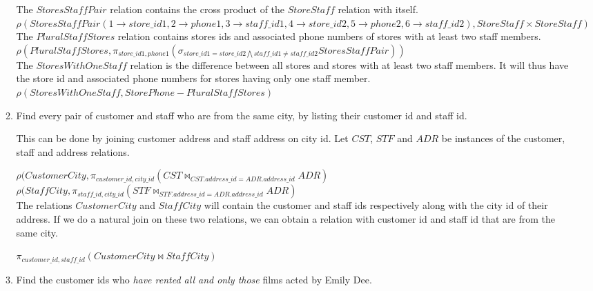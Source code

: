 \documentclass[paper=a4, fontsize=11pt]{scrartcl} %
\numberwithin{figure}{section} %
\numberwithin{table}{section} %
\begin{document}
\begin{enumerate}
\begin{enumerate}
The $StoresStaffPair$ relation contains the cross product of the $StoreStaff$ relation with itself.\\

$\rho(StoresStaffPair(1 \rightarrow store\_id1, 2 \rightarrow phone1, 3 \rightarrow staff\_id1, 4 \rightarrow store\_id2, 5 \rightarrow phone2, 6 \rightarrow staff\_id2), StoreStaff \times StoreStaff)$\\

The $PluralStaffStores$ relation contains stores ids and associated phone numbers of stores with at least two staff members.\\

$\rho(PluralStaffStores, \pi_{store\_id1, phone1} (\sigma_{store\_id1 = store\_id2 \bigwedge staff\_id1 \neq staff\_id2} StoresStaffPair))$\\

The $StoresWithOneStaff$ relation is the difference between all stores and stores with at least two staff members. It will thus have the store id and associated phone numbers for stores having only one staff member.\\

$\rho(StoresWithOneStaff, StorePhone - PluralStaffStores)$

\item Find every pair of customer and staff who are from the same city, by listing their customer id and staff id.

This can be done by joining customer address and staff address on city id. Let $CST$, $STF$ and $ADR$ be instances of the customer, staff and address relations.

$\rho(CustomerCity, \pi_{customer\_id, city\_id} (CST \bowtie_{CST.address\_id = ADR.address\_id} ADR)$\\

$\rho(StaffCity, \pi_{staff\_id, city\_id} (STF \bowtie_{STF.address\_id = ADR.address\_id} ADR)$\\

The relations $CustomerCity$ and $StaffCity$ will contain the customer and staff ids respectively along with the city id of their address. If we do a natural join on these two relations, we can obtain a relation with customer id and staff id that are from the same city.

$\pi_{customer\_id, staff\_id} (CustomerCity \bowtie StaffCity)$

\item Find the customer ids who \textit{have rented all and only those} films acted by Emily Dee.


\end{enumerate}
\end{enumerate}
\end{document}
